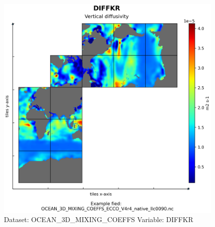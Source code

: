 \begin{figure}[H]
\centering
\includegraphics[scale=0.55]{../images/plots/native_plots/Ocean_3D_Gent-Mcwilliams_Redi_and_Background_Vertical_Diffusivity_Coefficients_for_the_Lat-Lon-Cap_90_(llc90)_Native_Model_Grid_(Version_4_Release_4)/DIFFKR.png}
\caption{Dataset: OCEAN\_3D\_MIXING\_COEFFS Variable: DIFFKR}
\label{tab:table-OCEAN_3D_MIXING_COEFFS_DIFFKR-Plot}
\end{figure}
\pagebreak
